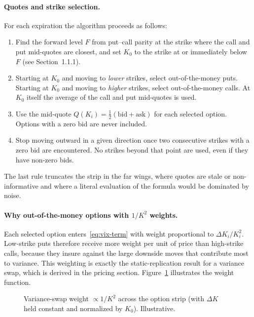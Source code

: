 \paragraph{Quotes and strike selection.} For each expiration the algorithm proceeds as follows:
\begin{enumerate}
  \item Find the forward level $F$ from put--call parity at the strike where the call and put mid-quotes are closest, and set $K_0$ to the strike at or immediately below $F$ (see Section~1.1.1).
  \item Starting at $K_0$ and moving to \emph{lower} strikes, select out-of-the-money puts. Starting at $K_0$ and moving to \emph{higher} strikes, select out-of-the-money calls. At $K_0$ itself the average of the call and put mid-quotes is used.
  \item Use the mid-quote $Q(K_i)=\tfrac12(\text{bid}+\text{ask})$ for each selected option. Options with a zero bid are never included.
  \item Stop moving outward in a given direction once two consecutive strikes with a zero bid are encountered. No strikes beyond that point are used, even if they have non-zero bids.
\end{enumerate}
The last rule truncates the strip in the far wings, where quotes are stale or non-informative and where a literal evaluation of the formula would be dominated by noise.

\paragraph{Why out-of-the-money options with $1/K^2$ weights.} Each selected option enters~\eqref{eq:vix-term} with weight proportional to $\Delta K_i/K_i^2$. Low-strike puts therefore receive more weight per unit of price than high-strike calls, because they insure against the large downside moves that contribute most to variance. This weighting is exactly the static-replication result for a variance swap, which is derived in the pricing section. Figure~\ref{fig:weights} illustrates the weight function.

\begin{figure}[htbp]
  \centering
  \caption{Variance-swap weight $\propto 1/K^2$ across the option strip (with $\Delta K$ held constant and normalized by $K_0$). Illustrative.}
  \label{fig:weights}
\end{figure}

